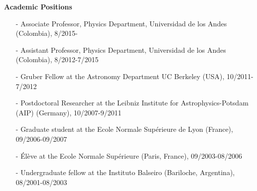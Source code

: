 \documentclass[letterpaper,11pt,onecolumn]{article}
\begin{document}
{\bf Academic Positions}
\begin{itemize}
\item[-] Associate Professor, Physics Department, Universidad de los Andes (Colombia), 8/2015-
\item[-] Assistant Professor, Physics Department, Universidad de los Andes (Colombia), 8/2012-7/2015
\item[-] Gruber Fellow at the Astronomy Department UC Berkeley (USA), 10/2011-7/2012
\item[-] Postdoctoral Researcher at the Leibniz Institute for
  Astrophysics-Potsdam (AIP) (Germany), 10/2007-9/2011  
\item[-] Graduate student at the Ecole Normale Sup\'erieure de Lyon
  (France), 09/2006-09/2007  
\item[-] \'El\`eve at the Ecole Normale Sup\'erieure (Paris, France),
  09/2003-08/2006 
\item[-] Undergraduate fellow at the Instituto Balseiro (Bariloche,
  Argentina), 08/2001-08/2003 
\end{itemize}

\newpage
\end{document}
